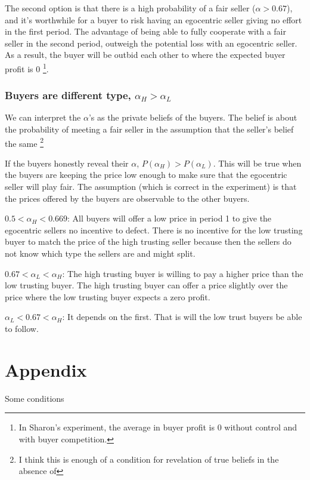 \documentclass{article}
\begin{document}
The second option is that there is a high probability of a fair seller ($\alpha > 0.67$), and it's worthwhile for a buyer to risk having an egocentric seller giving no effort in the first period. The advantage of being able to fully cooperate with a fair seller in the second period, outweigh the potential loss with an egocentric seller. As a result, the buyer will be outbid each other to where the expected buyer profit is 0 \footnote{In Sharon's experiment, the average in buyer profit is 0 without control and with buyer competition.}.

\subsubsection{Buyers are different type, $\alpha_H > \alpha_L$}

We can interpret the $\alpha$'s as the private beliefs of the buyers. The belief is about the probability of meeting a fair seller in the assumption that the seller's belief the same \footnote{I think this is enough of a condition for revelation of true beliefs in the absence of }

If the buyers honestly reveal their $\alpha$, $P(\alpha_H) > P(\alpha_L)$. This will be true when the buyers are keeping the price low enough to make sure that the egocentric seller will play fair. The assumption (which is correct in the experiment) is that the prices offered by the buyers are observable to the other buyers.

\emph{$0.5 < \alpha_H < 0.669$}: All buyers will offer a low price in period 1 to give the egocentric sellers no incentive to defect. There is no incentive for the low trusting buyer to match the price of the high trusting seller because then the sellers do not know which type the sellers are and might split. 

\emph{$0.67 < \alpha_L < \alpha_H$}: The high trusting buyer is willing to pay a higher price than the low trusting buyer. The high trusting buyer can offer a price slightly over the price where the low trusting buyer expects a zero profit.

\emph{$\alpha_L < 0.67 < \alpha_H$}: It depends on the first. That is will the low trust buyers be able to follow. 


\section{Appendix}

Some conditions
\end{document}
